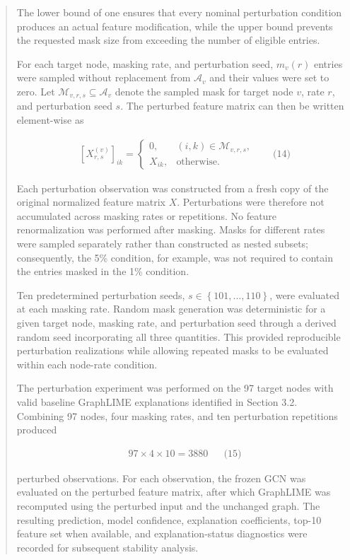 \documentclass[a4paper]{article}
\begin{document}
\begin{quote}
The lower bound of one ensures that every nominal perturbation condition
produces an actual feature modification, while the upper bound prevents
the requested mask size from exceeding the number of eligible entries.

For each target node, masking rate, and perturbation seed, \(m_{v}(r)\)
entries were sampled without replacement from \(\mathcal{A}_{v}\) and
their values were set to zero. Let
\(\mathcal{M}_{v,r,s} \subseteq \mathcal{A}_{v}\) denote the sampled
mask for target node \(v\), rate \(r\), and perturbation seed \(s\). The
perturbed feature matrix can then be written element-wise as

\[\begin{matrix}
 & \left\lbrack X_{r,s}^{(v)} \right\rbrack_{ik} = \left\{ \begin{matrix}
0, & \left( i,k \right) \in \mathcal{M}_{v,r,s}, \\
X_{ik}, & \text{otherwise}.
\end{matrix} \right.\  & & \text{(14)}
\end{matrix}
\]

Each perturbation observation was constructed from a fresh copy of the
original normalized feature matrix \(X\). Perturbations were therefore
not accumulated across masking rates or repetitions. No feature
renormalization was performed after masking. Masks for different rates
were sampled separately rather than constructed as nested subsets;
consequently, the 5\% condition, for example, was not required to
contain the entries masked in the 1\% condition.

Ten predetermined perturbation seeds,
\(s \in \left\{ 101,\ldots,110 \right\}\), were evaluated at each
masking rate. Random mask generation was deterministic for a given
target node, masking rate, and perturbation seed through a derived
random seed incorporating all three quantities. This provided
reproducible perturbation realizations while allowing repeated masks to
be evaluated within each node-rate condition.

The perturbation experiment was performed on the 97 target nodes with
valid baseline GraphLIME explanations identified in Section 3.2.
Combining 97 nodes, four masking rates, and ten perturbation repetitions
produced

\[\begin{matrix}
 & 97 \times 4 \times 10 = 3880 & & \text{(15)}
\end{matrix}
\]

perturbed observations. For each observation, the frozen GCN was
evaluated on the perturbed feature matrix, after which GraphLIME was
recomputed using the perturbed input and the unchanged graph. The
resulting prediction, model confidence, explanation coefficients, top-10
feature set when available, and explanation-status diagnostics were
recorded for subsequent stability analysis.


\end{quote}
\end{document}
